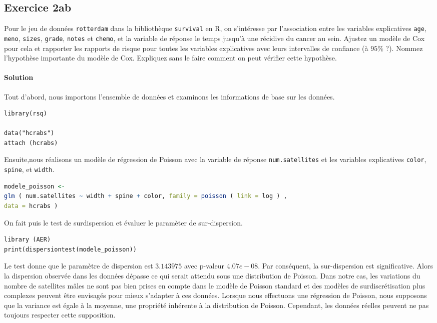 \documentclass[../main.tex]{subfiles}
\begin{document}
\begin{CJK*}{UTF8}{gbsn}
\section*{Exercice 2ab}
Pour le jeu de données 
\texttt{rotterdam} dans la bibliothèque \texttt{survival} en R, 
on s'intéresse par l'association entre les variables explicatives \texttt{age}, \texttt{meno}, 
\texttt{sizes}, \texttt{grade}, \texttt{notes} et \texttt{chemo},
et la variable de réponse le temps jusqu'à une récidive du cancer au sein.
Ajustez un modèle de Cox pour cela et rapporter 
les rapports de risque pour toutes les variables explicatives avec leurs intervalles de confiance (à $95\%$ ?).
Nommez l'hypothèse importante du modèle de Cox. 
Expliquez sans le faire comment on peut vérifier cette hypothèse.

\paragraph{Solution}
Tout d'abord, nous importons l'ensemble de données et examinons les informations de base sur les données.

\begin{lstlisting}
library(rsq)

data("hcrabs")
attach (hcrabs)

\end{lstlisting}

Ensuite,nous réalisons 
un modèle de régression de Poisson avec la variable de réponse \texttt{num.satellites} 
et les variables explicatives \texttt{color}, \texttt{spine}, et \texttt{width}.

\begin{lstlisting}[language=R]
modele_poisson <- 
glm ( num.satellites ~ width + spine + color, family = poisson ( link = log ) ,
data = hcrabs ) 
\end{lstlisting}

On fait puis le test de surdispersion et évaluer le paramèter de sur-dispersion.

\begin{lstlisting}
library (AER)
print(dispersiontest(modele_poisson))
\end{lstlisting}

Le test donne que le paramètre de dispersion est $3.143975$ avec p-valeur $4.07e-08$.
Par conséquent, la sur-dispersion est significative.
Alors la dispersion observée dans les données 
dépasse ce qui serait attendu sous une distribution de Poisson. 
Dans notre cas, les variations du nombre de satellites mâles ne sont pas 
bien prises en compte dans le modèle de Poisson standard et 
des modèles de surdiscrétisation plus complexes peuvent être envisagés pour mieux s'adapter à ces données.
Lorsque nous effectuons une régression de Poisson, nous supposons que la variance est égale à la moyenne, 
une propriété inhérente à la distribution de Poisson. 
Cependant, les données réelles peuvent ne pas toujours respecter cette supposition. 


\end{CJK*}
\end{document}

